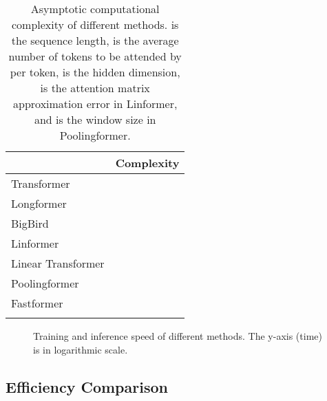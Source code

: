 \documentclass[11pt,a4paper]{article}
\begin{document}
\begin{table}[t]
\centering
\begin{tabular}{lc}
\Xhline{1.5pt}
\multicolumn{1}{c}{\textbf{Method}} & \multicolumn{1}{c}{\textbf{Complexity}} \\ \hline
Transformer                         &                           \\
Longformer                          &                                              \\
BigBird                             &                                              \\
Linformer                             &                                              \\
Linear Transformer                             &                                              \\
Poolingformer                             &                                              \\
Fastformer                      &                          \\ \Xhline{1.5pt}
\end{tabular}
\caption{Asymptotic computational complexity of different methods.  is the sequence length,  is the average number of tokens to be attended by per token,  is the hidden dimension,  is the attention matrix approximation error in Linformer, and  is the window size in Poolingformer.}\label{complexity}
\end{table}

\begin{figure*}[!t]
  \centering
  \caption{Training and inference speed of different methods. The y-axis (time) is in logarithmic scale.}\label{fig.speed}
\end{figure*}

\subsection{Efficiency Comparison}
\end{document}
